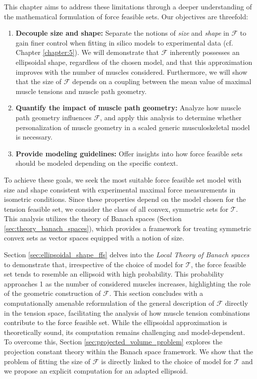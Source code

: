 This chapter aims to address these limitations through a deeper understanding of the mathematical formulation of force feasible sets. Our objectives are threefold:
\begin{enumerate}
  \item \textbf{Decouple size and shape:}  Separate the notions of \emph{size} and \emph{shape} in $\mathcal{F}$ to gain finer control when fitting in silico models to experimental data (cf. Chapter \ref{chapter:5}). We will demonstrate that $\mathcal{F}$ inherently possesses an ellipsoidal shape, regardless of the chosen model, and that this approximation improves with the number of muscles considered.  Furthermore, we will show that the size of $\mathcal{F}$ depends on a coupling between the mean value of maximal muscle tensions and muscle path geometry.
  \item \textbf{Quantify the impact of muscle path geometry:} Analyze how muscle path geometry influences $\mathcal{F}$, and apply this analysis to determine whether personalization of muscle geometry in a scaled generic musculoskeletal model is necessary.
  \item \textbf{Provide modeling guidelines:} Offer insights into how force feasible sets should be modeled depending on the specific context.
\end{enumerate}

To achieve these goals, we seek the most suitable force feasible set model with size and shape consistent with experimental maximal force measurements in isometric conditions. Since these properties depend on the model chosen for the tension feasible set, we consider the class of all convex, symmetric sets for $\mathcal{T}$. This analysis utilizes the theory of Banach spaces (Section \ref{sec:theory_banach_spaces}), which provides a framework for treating symmetric convex sets as vector spaces equipped with a notion of size.

Section \ref{sec:ellipsoidal_shape_ffs} delves into the \emph{Local Theory of Banach spaces} to demonstrate that, irrespective of the choice of model for $\mathcal{T}$, the force feasible set tends to resemble an ellipsoid with high probability. This probability approaches 1 as the number of considered muscles increases, highlighting the role of the geometric construction of $\mathcal{F}$. This section concludes with a computationally amenable reformulation of the general description of $\mathcal{F}$ directly in the tension space, facilitating the analysis of how muscle tension combinations contribute to the force feasible set. While the ellipsoidal approximation is theoretically sound, its computation remains challenging and model-dependent. To overcome this, Section \ref{sec:projected_volume_problem} explores the projection constant theory within the Banach space framework. We show that the problem of fitting the size of $\mathcal{F}$ is directly linked to the choice of model for $\mathcal{T}$ and we propose an explicit computation for an adapted ellipsoid.


